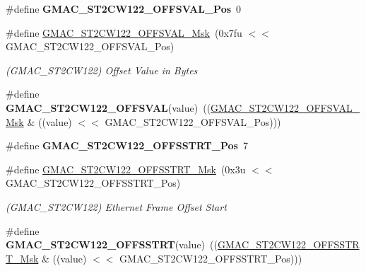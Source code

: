 \begin{DoxyCompactItemize}
\item 
\mbox{\label{group__SAME70__GMAC_ga8fa175ffaa53c99c1e6f08d1ea554cea}} 
\#define {\bfseries G\+M\+A\+C\+\_\+\+S\+T2\+C\+W122\+\_\+\+O\+F\+F\+S\+V\+A\+L\+\_\+\+Pos}~0
\item 
\mbox{\label{group__SAME70__GMAC_ga148c557d20a5ded91f40935560dfc650}} 
\#define \mbox{\hyperlink{group__SAME70__GMAC_ga148c557d20a5ded91f40935560dfc650}{G\+M\+A\+C\+\_\+\+S\+T2\+C\+W122\+\_\+\+O\+F\+F\+S\+V\+A\+L\+\_\+\+Msk}}~(0x7fu $<$$<$ G\+M\+A\+C\+\_\+\+S\+T2\+C\+W122\+\_\+\+O\+F\+F\+S\+V\+A\+L\+\_\+\+Pos)
\begin{DoxyCompactList}\small\item\em (G\+M\+A\+C\+\_\+\+S\+T2\+C\+W122) Offset Value in Bytes \end{DoxyCompactList}\item 
\mbox{\label{group__SAME70__GMAC_ga33833cf1147fdf04fac722c2e762d85e}} 
\#define {\bfseries G\+M\+A\+C\+\_\+\+S\+T2\+C\+W122\+\_\+\+O\+F\+F\+S\+V\+AL}(value)~((\mbox{\hyperlink{group__SAMV71__GMAC_ga148c557d20a5ded91f40935560dfc650}{G\+M\+A\+C\+\_\+\+S\+T2\+C\+W122\+\_\+\+O\+F\+F\+S\+V\+A\+L\+\_\+\+Msk}} \& ((value) $<$$<$ G\+M\+A\+C\+\_\+\+S\+T2\+C\+W122\+\_\+\+O\+F\+F\+S\+V\+A\+L\+\_\+\+Pos)))
\item 
\mbox{\label{group__SAME70__GMAC_ga0848e190ec3fc1295158dbd217b77556}} 
\#define {\bfseries G\+M\+A\+C\+\_\+\+S\+T2\+C\+W122\+\_\+\+O\+F\+F\+S\+S\+T\+R\+T\+\_\+\+Pos}~7
\item 
\mbox{\label{group__SAME70__GMAC_gac0a49370152e2eee31b4444643002e12}} 
\#define \mbox{\hyperlink{group__SAME70__GMAC_gac0a49370152e2eee31b4444643002e12}{G\+M\+A\+C\+\_\+\+S\+T2\+C\+W122\+\_\+\+O\+F\+F\+S\+S\+T\+R\+T\+\_\+\+Msk}}~(0x3u $<$$<$ G\+M\+A\+C\+\_\+\+S\+T2\+C\+W122\+\_\+\+O\+F\+F\+S\+S\+T\+R\+T\+\_\+\+Pos)
\begin{DoxyCompactList}\small\item\em (G\+M\+A\+C\+\_\+\+S\+T2\+C\+W122) Ethernet Frame Offset Start \end{DoxyCompactList}\item 
\mbox{\label{group__SAME70__GMAC_ga1207404e34facbd078e73bf7d094eaab}} 
\#define {\bfseries G\+M\+A\+C\+\_\+\+S\+T2\+C\+W122\+\_\+\+O\+F\+F\+S\+S\+T\+RT}(value)~((\mbox{\hyperlink{group__SAMV71__GMAC_gac0a49370152e2eee31b4444643002e12}{G\+M\+A\+C\+\_\+\+S\+T2\+C\+W122\+\_\+\+O\+F\+F\+S\+S\+T\+R\+T\+\_\+\+Msk}} \& ((value) $<$$<$ G\+M\+A\+C\+\_\+\+S\+T2\+C\+W122\+\_\+\+O\+F\+F\+S\+S\+T\+R\+T\+\_\+\+Pos)))

\end{DoxyCompactItemize}
